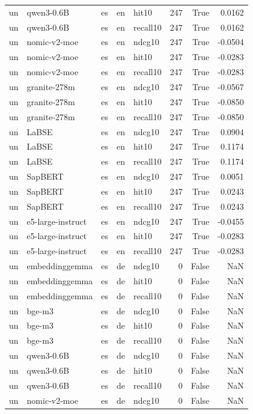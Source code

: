 \begin{tabular}{lllllrrr}
un & qwen3-0.6B & es & en & hit10 & 247 & True & 0.0162 \\
un & qwen3-0.6B & es & en & recall10 & 247 & True & 0.0162 \\
un & nomic-v2-moe & es & en & ndcg10 & 247 & True & -0.0504 \\
un & nomic-v2-moe & es & en & hit10 & 247 & True & -0.0283 \\
un & nomic-v2-moe & es & en & recall10 & 247 & True & -0.0283 \\
un & granite-278m & es & en & ndcg10 & 247 & True & -0.0567 \\
un & granite-278m & es & en & hit10 & 247 & True & -0.0850 \\
un & granite-278m & es & en & recall10 & 247 & True & -0.0850 \\
un & LaBSE & es & en & ndcg10 & 247 & True & 0.0904 \\
un & LaBSE & es & en & hit10 & 247 & True & 0.1174 \\
un & LaBSE & es & en & recall10 & 247 & True & 0.1174 \\
un & SapBERT & es & en & ndcg10 & 247 & True & 0.0051 \\
un & SapBERT & es & en & hit10 & 247 & True & 0.0243 \\
un & SapBERT & es & en & recall10 & 247 & True & 0.0243 \\
un & e5-large-instruct & es & en & ndcg10 & 247 & True & -0.0455 \\
un & e5-large-instruct & es & en & hit10 & 247 & True & -0.0283 \\
un & e5-large-instruct & es & en & recall10 & 247 & True & -0.0283 \\
un & embeddinggemma & es & de & ndcg10 & 0 & False & NaN \\
un & embeddinggemma & es & de & hit10 & 0 & False & NaN \\
un & embeddinggemma & es & de & recall10 & 0 & False & NaN \\
un & bge-m3 & es & de & ndcg10 & 0 & False & NaN \\
un & bge-m3 & es & de & hit10 & 0 & False & NaN \\
un & bge-m3 & es & de & recall10 & 0 & False & NaN \\
un & qwen3-0.6B & es & de & ndcg10 & 0 & False & NaN \\
un & qwen3-0.6B & es & de & hit10 & 0 & False & NaN \\
un & qwen3-0.6B & es & de & recall10 & 0 & False & NaN \\
un & nomic-v2-moe & es & de & ndcg10 & 0 & False & NaN \\

\end{tabular}
